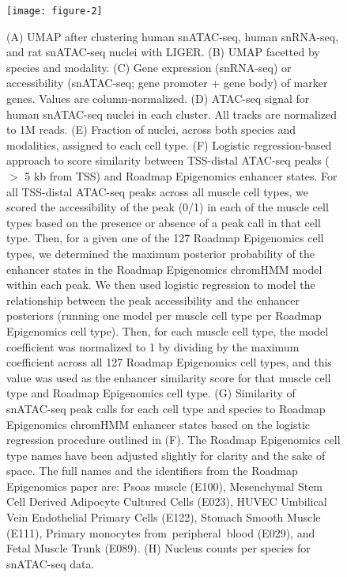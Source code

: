 \documentclass{article}
\begin{document}
\begin{figure}
\texttt{[image: figure-2]}
	\caption{(A) UMAP after clustering human snATAC-seq, human snRNA-seq, and rat snATAC-seq nuclei with LIGER. (B) UMAP facetted by species and modality. (C) Gene expression (snRNA-seq) or accessibility (snATAC-seq; gene promoter + gene body) of marker genes. Values are column-normalized. (D) ATAC-seq signal for human snATAC-seq nuclei in each cluster. All tracks are normalized to 1M reads. (E) Fraction of nuclei, across both species and modalities, assigned to each cell type. (F) Logistic regression-based approach to score similarity between TSS-distal ATAC-seq peaks ($>$ 5 kb from TSS) and Roadmap Epigenomics enhancer states. For all TSS-distal ATAC-seq peaks across all muscle cell types, we scored the accessibility of the peak (0/1) in each of the muscle cell types based on the presence or absence of a peak call in that cell type. Then, for a given one of the 127 Roadmap Epigenomics cell types, we determined the maximum posterior probability of the enhancer states in the Roadmap Epigenomics chromHMM model within each peak. We then used logistic regression to model the relationship between the peak accessibility and the enhancer posteriors (running one model per muscle cell type per Roadmap Epigenomics cell type). Then, for each muscle cell type, the model coefficient was normalized to 1 by dividing by the maximum coefficient across all 127 Roadmap Epigenomics cell types, and this value was used as the enhancer similarity score for that muscle cell type and Roadmap Epigenomics cell type. (G) Similarity of snATAC-seq peak calls for each cell type and species to Roadmap Epigenomics chromHMM enhancer states based on the logistic regression procedure outlined in (F). The Roadmap Epigenomics cell type names have been adjusted slightly for clarity and the sake of space. The full names and the identifiers from the Roadmap Epigenomics paper are: Psoas muscle (E100), Mesenchymal Stem Cell Derived Adipocyte Cultured Cells (E023), HUVEC Umbilical Vein Endothelial Primary Cells (E122), Stomach Smooth Muscle (E111), Primary monocytes from peripheral blood (E029), and Fetal Muscle Trunk (E089). (H) Nucleus counts per species for snATAC-seq data.}
\end{figure}
\end{document}

